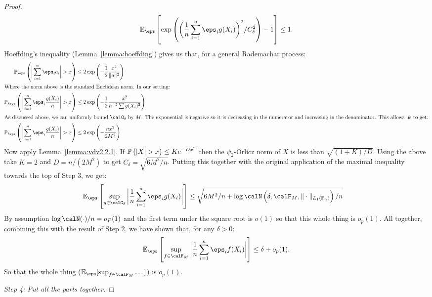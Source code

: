 \begin{proof}
	 \[
		 \E_\eps\left[\exp\left(\bigg(\frac{1}{n}\sum_{i=1}^n \eps_ig(X_i)\bigg)^2/C_\delta^2\right)-1\right]\leq 1
	.\] 
	Hoeffding's inequality (Lemma~\ref{lemma:hoeffding}) gives us that, for a general Rademachar process:
	\begin{align*}
		\P_\eps\left(\bigg|\sum_{i=1}^n \eps_ia_i\bigg|>x\right) &\leq 2\exp\left(-\frac{1}{2}\frac{x^2}{\|a\|^2}\right)\\
		\intertext{Where the norm above is the standard Euclidean norm. In our setting:}
		\P_\eps\left(\bigg|\sum_{i=1}^n \eps_i\frac{g(X_i)}{n} \bigg| > x\right) &\leq 2\exp\left(-\frac{1}{2}\frac{x^2}{n^{-2}\sum g(X_i)^2} \right)\\
		\intertext{As discussed above, we can uniformly bound  \(\calG_\delta\) by  \(M\). The exponential is negative so it is decreasing in the numerator and increasing in the denominator. This allows us to get:} 
		\P_\eps\left(\bigg|\sum_{i=1}^n \eps_i\frac{g(X_i)}{n} \bigg| > x\right) &\leq 2\exp\left(-\frac{n x^2}{2M^2} \right)
	\end{align*}
	Now apply Lemma~\ref{lemma:vdv2.2.1}. If \(\P\left(|X|>x\right)\leq Ke^{-Dx^2}\) then the \(\psi_2\)-Orlicz norm of \(X\) is less than  \(\sqrt{(1+K)/D}\). Using the above take \(K=2\) and \(D = n/(2M^2)\) to get \(C_\delta = \sqrt{6M^2/n}\). Putting this together with the original application of the maximal inequality towards the top of Step 3, we get:
	\begin{align*}
		\E_\eps\left[\sup_{g\in\calG_\delta}\bigg|\frac{1}{n}\sum_{i=1}^n \eps_ig(X_i)\bigg|\right]&\leq \sqrt{6M^2/n + \log\calN\left(\delta,\calF_M,\|\cdot\|_{L_1(\P_n)}\right)/n}
	\end{align*}
	By assumption \(\log\calN(\cdot)/n = o_P(1)\) and the first term under the square root is \(o(1)\) so that this whole thing is \(o_p(1)\). All together, combining this with the result of Step 2, we have shown that, for any \(\delta > 0\):
	\[
		\E_\eps\left[\sup_{f\in\calF_M}\bigg|\frac{1}{n}\sum_{i=1}^n \eps_if(X_i)\bigg|\right] \leq \delta + o_p(1) 
	.\] 
	So that the whole thing (\(\E_\eps[\sup_{f\in\calF_M}\dots]\)) is \(o_p(1)\). 

	\textit{Step 4: Put all the parts together.}
	

\end{proof}
